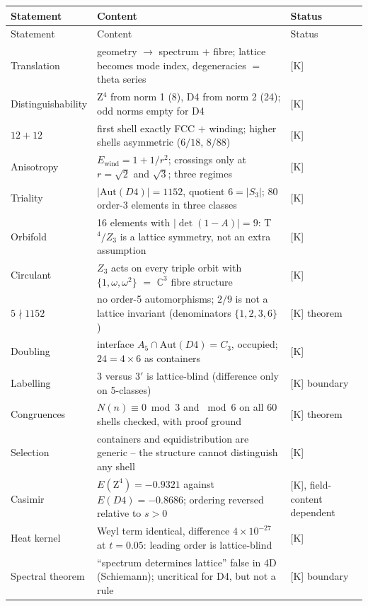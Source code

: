{\small
\begin{longtable}{lp{6.4cm}l}
\toprule
Statement & Content & Status \\
\midrule
\endfirsthead
\toprule
Statement & Content & Status \\
\midrule
\endhead
\bottomrule
\endfoot
Translation & geometry $\to$ spectrum $+$ fibre; lattice becomes
  mode index, degeneracies $=$ theta series & [K] \\
Distinguishability & Z$^4$ from norm 1 (8), D4 from norm 2 (24);
  odd norms empty for D4 & [K] \\
$12+12$ & first shell exactly FCC $+$ winding; higher shells
  asymmetric ($6/18$, $8/88$) & [K] \\
Anisotropy & $E_\text{wind} = 1 + 1/r^2$; crossings only at
  $r = \sqrt2$ and $\sqrt3$; three regimes & [K] \\
Triality & $|\text{Aut}(D4)| = 1152$, quotient $6 = |S_3|$;
  80 order-3 elements in three classes & [K] \\
Orbifold & 16 elements with $|\det(1-A)| = 9$: T$^4/Z_3$ is a
  lattice symmetry, not an extra assumption & [K] \\
Circulant & $Z_3$ acts on every triple orbit with
  $\{1,\omega,\omega^2\}$ $=$ $\mathbb{C}^3$ fibre structure & [K] \\
$5 \nmid 1152$ & no order-5 automorphisms; $2/9$ is not a lattice
  invariant (denominators $\{1,2,3,6\}$) & [K] theorem \\
Doubling & interface $A_5 \cap \text{Aut}(D4) = C_3$, occupied;
  $24 = 4\times6$ as containers & [K] \\
Labelling & $3$ versus $3'$ is lattice-blind (difference only on
  5-classes) & [K] boundary \\
Congruences & $N(n) \equiv 0 \bmod 3$ and $\bmod 6$ on all 60
  shells checked, with proof ground & [K] theorem \\
Selection & containers and equidistribution are generic --
  the structure cannot distinguish any shell & [K] \\
Casimir & $E(\text{Z}^4) = -0.9321$ against
  $E(D4) = -0.8686$; ordering reversed relative to $s>0$
  & [K], field-content dependent \\
Heat kernel & Weyl term identical, difference $4\times10^{-27}$ at
  $t = 0.05$: leading order is lattice-blind & [K] \\
Spectral theorem & \enquote{spectrum determines lattice} false in 4D
  (Schiemann); uncritical for D4, but not a rule & [K] boundary \\

\end{longtable}}
